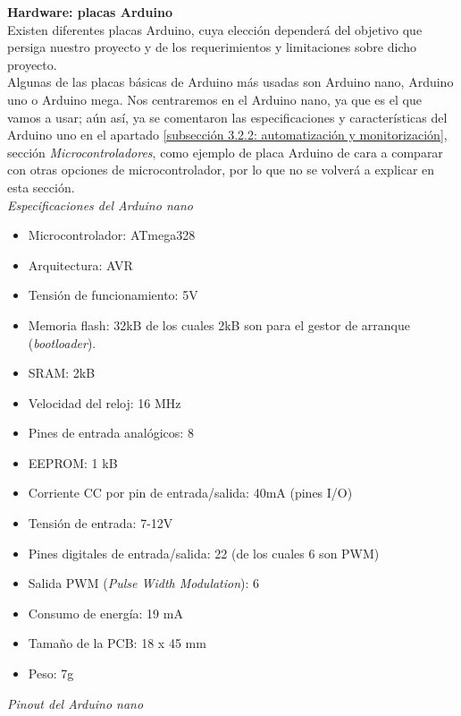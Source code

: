 \documentclass[12pt]{article}
\begin{document}
	\noindent \textbf{Hardware: placas Arduino} \\
	
	\noindent Existen diferentes placas Arduino, cuya elección dependerá del objetivo que persiga nuestro proyecto y de los requerimientos y limitaciones sobre dicho proyecto. \\
	
	\noindent Algunas de las placas básicas de Arduino más usadas son Arduino nano, Arduino uno o Arduino mega. Nos centraremos en el Arduino nano, ya que es el que vamos a usar; aún así, ya se comentaron las especificaciones y características del Arduino uno en el apartado \ref{subsección 3.2.2: automatización y monitorización}, sección \textit{Microcontroladores}, como ejemplo de placa Arduino de cara a comparar con otras opciones de microcontrolador, por lo que no se volverá a explicar en esta sección.  \\
	
	\noindent \textit{Especificaciones del Arduino nano} \\
	
	\begin{itemize}
		\item Microcontrolador: ATmega328
		\item Arquitectura: AVR
		\item Tensión de funcionamiento: 5V
		\item Memoria flash: 32kB de los cuales 2kB son para el gestor de arranque (\textit{bootloader}).
		\item SRAM: 2kB
		\item Velocidad del reloj: 16 MHz
		\item Pines de entrada analógicos: 8
		\item EEPROM: 1 kB
		\item Corriente CC por pin de entrada/salida: 40mA (pines I/O)
		\item Tensión de entrada: 7-12V
		\item Pines digitales de entrada/salida: 22 (de los cuales 6 son PWM)
		\item Salida PWM (\textit{Pulse Width Modulation}): 6
		\item Consumo de energía: 19 mA
		\item Tamaño de la PCB: 18 x 45 mm
		\item Peso: 7g
	\end{itemize}
	
	\noindent \textit{Pinout del Arduino nano} \\
	
\end{document}
